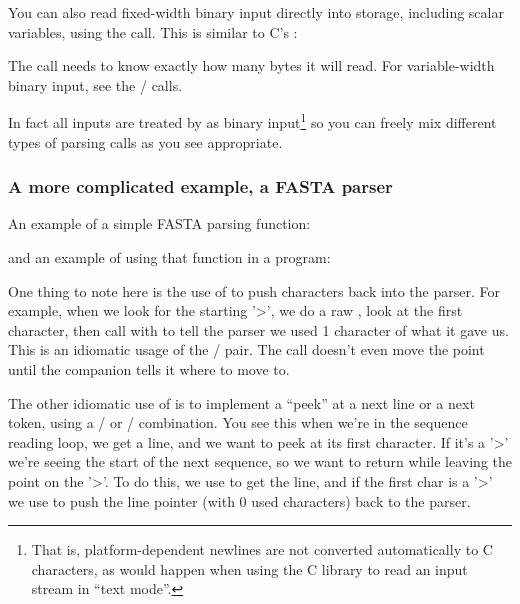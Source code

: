 You can also read fixed-width binary input directly into storage,
including scalar variables, using the 
call. This is similar to C's :



The  call needs to know exactly how many bytes 
it will read. For variable-width binary input, see the
/ calls.

In fact all inputs are treated by  as binary
input\footnote{That is, platform-dependent newlines are not converted
  automatically to C \ccode{\n} characters, as would happen when using
  the C  library to read an input stream in ``text
  mode''.} so you can freely mix different types of
 parsing calls as you see appropriate.


\subsubsection{A more complicated example, a FASTA parser}

An example of a simple FASTA parsing function:



and an example of using that function in a program:



One thing to note here is the use of  to
push characters back into the parser. For example, when we look for
the starting '>', we do a raw , look at the
first character, then call  with
 to tell the parser we used 1 character of what it gave
us. This is an idiomatic usage of the
/ pair.  The
 call doesn't even move the point until the
companion  tells it where to move to.

The other idiomatic use of  is to implement
a ``peek'' at a next line or a next token, using a
/ or
/
combination. You see this when we're in the sequence reading loop, we
get a line, and we want to peek at its first character. If it's a '>'
we're seeing the start of the next sequence, so we want to return
while leaving the point on the '>'. To do this, we use
 to get the line, and if the first char
is a '>' we use  to push the line pointer
(with 0 used characters) back to the parser.


